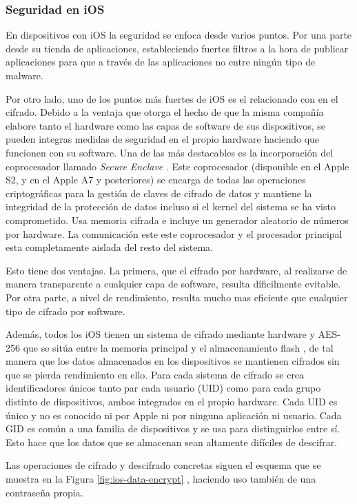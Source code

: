 \subsubsection{Seguridad en iOS}

En dispositivos con iOS la seguridad se enfoca desde varios puntos. Por una parte desde su tienda de aplicaciones, estableciendo fuertes filtros a la hora de publicar aplicaciones para que a través de las aplicaciones no entre ningún tipo de malware.

Por otro lado, uno de los puntos más fuertes de iOS es el relacionado con en el cifrado. Debido a la ventaja que otorga el hecho de que la misma compañía elabore tanto el hardware como las capas de software de sus dispositivos, se pueden integras medidas de seguridad en el propio hardware haciendo que funcionen con su software. Una de las más destacables es la incorporación del coprocesador llamado \emph{Secure Enclave} \cite{ios-sec-guide}. Este coprocesador (disponible en el Apple S2, y en el Apple A7 y posteriores) se encarga de todas las operaciones criptográficas para la gestión de claves de cifrado de datos y mantiene la integridad de la protección de datos incluso si el kernel del sistema se ha visto comprometido. Usa memoria cifrada e incluye un generador aleatorio de números por hardware. La comunicación este este coprocesador y el procesador principal esta completamente aislada del resto del sistema.

Esto tiene dos ventajas. La primera, que el cifrado por hardware, al realizarse de manera transparente a cualquier capa de software, resulta díficilmente evitable. Por otra parte, a nivel de rendimiento, resulta mucho mas eficiente que cualquier tipo de cifrado por software.

Además, todos los iOS tienen un sistema de cifrado mediante hardware y AES-256 que se sitúa entre la memoria principal y el almacenamiento flash \cite{ios-sec-guide}, de tal manera que los datos almacenados en los dispositivos se mantienen cifrados sin que se pierda rendimiento en ello. Para cada sistema de cifrado se crea identificadores únicos tanto par cada usuario (UID) como para cada grupo distinto de dispositivos, ambos integrados en el propio hardware. Cada UID es único y no es conocido ni por Apple ni por ninguna aplicación ni usuario. Cada GID es común a una familia de dispositivos y se usa para distinguirlos entre sí. Esto hace que los datos que se almacenan sean altamente difíciles de descifrar.

Las operaciones de cifrado y descifrado concretas siguen el esquema que se muestra en la Figura \ref{fig:ios-data-encrypt} , haciendo uso también de una contraseña propia.


